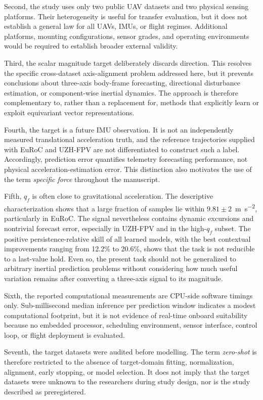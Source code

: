 \documentclass[preprint,12pt]{elsarticle}
\newcommand{\qf}{q_f}
\begin{document}
Second, the study uses only two public UAV datasets and two physical sensing platforms. Their heterogeneity is useful for transfer evaluation, but it does not establish a general law for all UAVs, IMUs, or flight regimes. Additional platforms, mounting configurations, sensor grades, and operating environments would be required to establish broader external validity.

Third, the scalar magnitude target deliberately discards direction. This resolves the specific cross-dataset axis-alignment problem addressed here, but it prevents conclusions about three-axis body-frame forecasting, directional disturbance estimation, or component-wise inertial dynamics. The approach is therefore complementary to, rather than a replacement for, methods that explicitly learn or exploit equivariant vector representations.

Fourth, the target is a future IMU observation. It is not an independently measured translational acceleration truth, and the reference trajectories supplied with EuRoC and UZH-FPV are not differentiated to construct such a label. Accordingly, prediction error quantifies telemetry forecasting performance, not physical acceleration-estimation error. This distinction also motivates the use of the term \emph{specific force} throughout the manuscript.

Fifth, $\qf$ is often close to gravitational acceleration. The descriptive characterization shows that a large fraction of samples lie within $9.81\pm2$~\si{\metre\per\second\squared}, particularly in EuRoC. The signal nevertheless contains dynamic excursions and nontrivial forecast error, especially in UZH-FPV and in the high-$\qf$ subset. The positive persistence-relative skill of all learned models, with the best contextual improvements ranging from 12.2\% to 20.6\%, shows that the task is not reducible to a last-value hold. Even so, the present task should not be generalized to arbitrary inertial prediction problems without considering how much useful variation remains after converting a three-axis signal to its magnitude.

Sixth, the reported computational measurements are CPU-side software timings only. Sub-millisecond median inference per prediction window indicates a modest computational footprint, but it is not evidence of real-time onboard suitability because no embedded processor, scheduling environment, sensor interface, control loop, or flight deployment is evaluated.

Seventh, the target datasets were audited before modelling. The term \emph{zero-shot} is therefore restricted to the absence of target-domain fitting, normalization, alignment, early stopping, or model selection. It does not imply that the target datasets were unknown to the researchers during study design, nor is the study described as preregistered.
\end{document}
